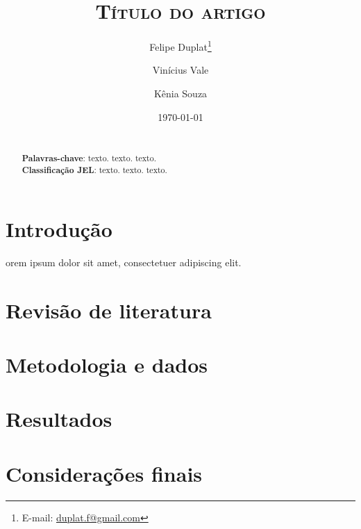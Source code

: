 \documentclass[a4paper, 11pt]{article}
\title{\textsc{Título do artigo}}
\author[$\Psi$]{Felipe Duplat\thanks{E-mail: \href{mailto:duplat.f@gmail.com}{duplat.f@gmail.com}}}
\author[$\Psi$]{Vinícius Vale}
\author[$\Psi$]{Kênia Souza}
\affil[$\Psi$]{\footnotesize Universidade Federal do Paraná, Brasil}
\date{\today}
\begin{document}
\maketitle


\begin{abstract}
	\lipsum[1] \\
	\textbf{Palavras-chave}: texto. texto. texto. \\
	\textbf{Classificação JEL}: texto. texto. texto.
\end{abstract}


\vspace{0.5cm}



\begin{multicols}{2}

\section{Introdução}

\lettrine[lines=3,loversize=.6,lraise=.1,nindent=.5em]{}{} orem ipsum dolor sit amet, consectetuer adipiscing elit. \lipsum[1-4]



\section{Revisão de literatura}

\lipsum[1-7]



\section{Metodologia e dados}

\lipsum[1-4]



\section{Resultados}

\lipsum[1-5]



\section{Considerações finais}

\lipsum[1-6]



\printbibliography[title={Referências}]

\end{multicols}
\end{document}
